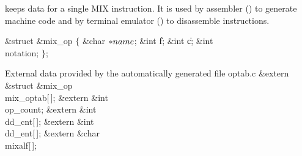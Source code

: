  keeps data for a single MIX instruction. It is
used
by assembler () to generate machine code and by terminal
emulator () to disassemble instructions.

\Y\B\&{struct} \&{mix\_op} ${}\{{}$\1\6
\&{char} ${}{*}\\{name}{}$;\6
\&{int} \|f;\6
\&{int} \|c;\6
\&{int} \\{notation};\2\6
${}\}{}$;\par
\fi

External data provided by the automatically generated file optab.c
\Y\B\&{extern} \&{struct} \&{mix\_op} \\{mix\_optab}[\,];\6
\&{extern} \&{int} \\{op\_count};%
\6
\&{extern} \&{int} \\{dd\_cnt}[\,];\6
\&{extern} \&{int} \\{dd\_ent}[\,];\6
\&{extern} \&{char} \\{mixalf}[\,];\par
\fi

\inx
\fin
\con
